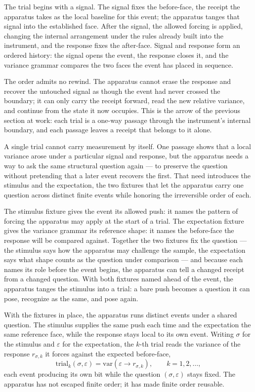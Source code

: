 The trial begins with a signal. The signal fixes the before-face, the receipt the apparatus takes as the local baseline for this event; the apparatus tanges that signal into the established face. After the signal, the allowed forcing is applied, changing the internal arrangement under the rules already built into the instrument, and the response fixes the after-face. Signal and response form an ordered history: the signal opens the event, the response closes it, and the variance grammar compares the two faces the event has placed in sequence.

The order admits no rewind. The apparatus cannot erase the response and recover the untouched signal as though the event had never crossed the boundary; it can only carry the receipt forward, read the new relative variance, and continue from the state it now occupies. This is the arrow of the previous section at work: each trial is a one-way passage through the instrument's internal boundary, and each passage leaves a receipt that belongs to it alone.

A single trial cannot carry measurement by itself. One passage shows that a local variance arose under a particular signal and response, but the apparatus needs a way to ask the same structural question again --- to preserve the question without pretending that a later event recovers the first. That need introduces the stimulus and the expectation, the two fixtures that let the apparatus carry one question across distinct finite events while honoring the irreversible order of each.

The stimulus fixture gives the event its allowed push: it names the pattern of forcing the apparatus may apply at the start of a trial. The expectation fixture gives the variance grammar its reference shape: it names the before-face the response will be compared against. Together the two fixtures fix the question --- the stimulus says how the apparatus may challenge the sample, the expectation says what shape counts as the question under comparison --- and because each names its role before the event begins, the apparatus can tell a changed receipt from a changed question. With both fixtures named ahead of the event, the apparatus tanges the stimulus into a trial: a bare push becomes a question it can pose, recognize as the same, and pose again.

With the fixtures in place, the apparatus runs distinct events under a shared question. The stimulus supplies the same push each time and the expectation the same reference face, while the response stays local to its own event. Writing $\sigma$ for the stimulus and $\varepsilon$ for the expectation, the $k$-th trial reads the variance of the response $r_{\sigma,k}$ it forces against the expected before-face,
\[ \mathrm{trial}_k(\sigma,\varepsilon) = \mathrm{var}(\varepsilon \to r_{\sigma,k}), \qquad k = 1, 2, \dots, \]
each event producing its own bit while the question $(\sigma,\varepsilon)$ stays fixed. The apparatus has not escaped finite order; it has made finite order reusable.

